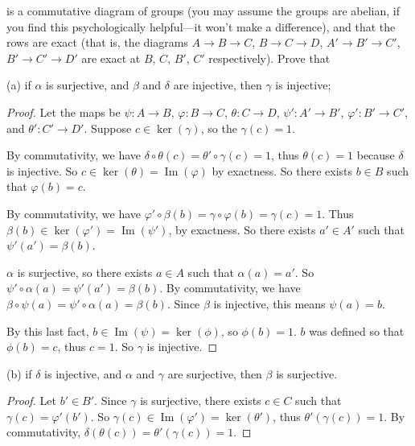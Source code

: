 \documentclass[10pt]{article}
\DeclareMathOperator*{\im}{Im}
\begin{document}
\begin{enumerate}
\begin{center}
\end{center}
is a commutative diagram of groups (you may assume the groups are abelian, if you find this psychologically helpful---it won't make a difference), and that the rows are exact (that is, the diagrams $A \rightarrow B \rightarrow C$, $B \rightarrow C \rightarrow D$, $A' \rightarrow B' \rightarrow C'$, $B' \rightarrow C' \rightarrow D'$ are exact at $B$, $C$, $B'$, $C'$ respectively).  Prove that

(a) if $\alpha$ is surjective, and $\beta$ and $\delta$ are injective, then $\gamma$ is injective;

\begin{proof}
Let the maps be $\psi: A \rightarrow B$, $\varphi: B \rightarrow C$, $\theta : C \rightarrow D$, $\psi ': A' \rightarrow B'$, $\varphi ': B' \rightarrow C'$, and $\theta ' : C' \rightarrow D'$.  Suppose $c \in \ker(\gamma)$, so the $\gamma(c) = 1$.

By commutativity, we have $\delta \circ \theta ( c) = \theta' \circ \gamma (c) = 1$, thus $\theta(c) = 1$ because $\delta$ is injective.  So $c \in \ker (\theta) = \im (\varphi)$ by exactness.  So there exists $b \in B$ such that $\varphi(b) = c$.

By commutativity, we have $\varphi ' \circ \beta (b) = \gamma \circ \varphi (b) = \gamma (c) = 1$.  Thus $\beta(b) \in \ker (\varphi ') = \im (\psi ')$, by exactness.  So there exists $a' \in A'$ such that $\psi ' (a') = \beta(b)$.

$\alpha$ is surjective, so there exists $a \in A$ such that $\alpha(a) = a'$.  So $\psi' \circ \alpha(a) = \psi'(a') = \beta(b)$.  By commutativity, we have $\beta \circ \psi (a) = \psi' \circ \alpha(a) = \beta(b)$.  Since $\beta$ is injective, this means $\psi(a) = b$.

By this last fact, $b \in \im (\psi) = \ker(\phi)$, so $\phi(b) = 1$.  $b$ was defined so that $\phi(b) = c$, thus $c = 1$.  So $\gamma$ is injective.
\end{proof}

(b) if $\delta$ is injective, and $\alpha$ and $\gamma$ are surjective, then $\beta$ is surjective.

\begin{proof}
Let $b' \in B'$.  Since $\gamma$ is surjective, there exists $c \in C$ such that $\gamma(c) = \varphi '(b')$.  So $\gamma(c) \in \im (\varphi') = \ker (\theta')$, thus $\theta'(\gamma(c)) = 1$.  By commutativity, $\delta(\theta(c)) = \theta'(\gamma(c)) = 1$.


\end{proof}
\end{enumerate}
\end{document}
